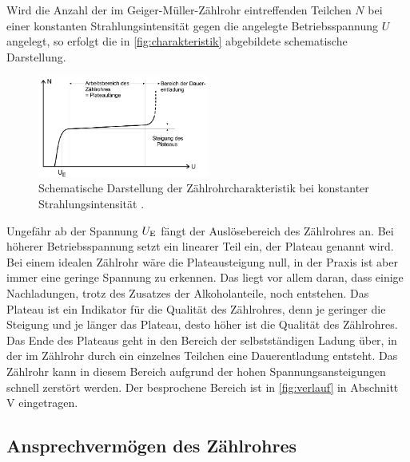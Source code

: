 Wird die Anzahl der im Geiger-Müller-Zählrohr eintreffenden Teilchen $N$ bei einer konstanten Strahlungsintensität gegen die angelegte Betriebsspannung $U$ angelegt, so erfolgt die in \autoref{fig:charakteristik} abgebildete schematische Darstellung.
\begin{figure}[H]
    \centering
    \includegraphics[width=0.5\textwidth]{data/charakteristik.png}
    \caption{Schematische Darstellung der Zählrohrcharakteristik bei konstanter Strahlungsintensität \cite{Anleitung703}.}
    \label{fig:charakteristik}
\end{figure}

Ungefähr ab der Spannung $U_\text E$ fängt der Auslösebereich des Zählrohres an. Bei höherer Betriebsspannung setzt ein linearer Teil ein, der Plateau genannt wird. Bei einem idealen Zählrohr wäre die Plateausteigung null, in der Praxis ist aber immer eine geringe Spannung zu erkennen.
Das liegt vor allem daran, dass einige Nachladungen, trotz des Zusatzes der Alkoholanteile, noch entstehen. Das Plateau ist ein Indikator für die Qualität des Zählrohres, denn je geringer die Steigung und je länger das Plateau, desto höher ist die Qualität des Zählrohres.
Das Ende des Plateaus geht in den Bereich der selbstständigen Ladung über, in der im Zählrohr durch ein einzelnes Teilchen eine Dauerentladung entsteht. Das Zählrohr kann in diesem Bereich aufgrund der hohen Spannungsansteigungen schnell zerstört werden.
Der besprochene Bereich ist in \autoref{fig:verlauf} in Abschnitt \RN{5} eingetragen.

\subsection{Ansprechvermögen des Zählrohres}
\label{subsec:Ansprechvermoegen}

